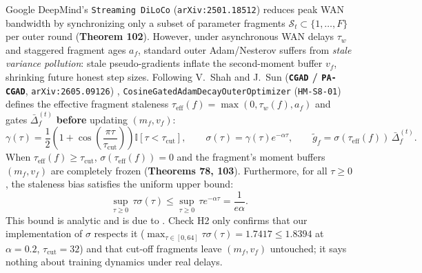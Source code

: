 \documentclass[11pt,a4paper]{article}
\begin{document}
Google DeepMind's \texttt{Streaming DiLoCo} (\texttt{arXiv:2501.18512}) \cite{douillard2025streamingdiloco} reduces peak WAN bandwidth by synchronizing only a subset of parameter fragments $\mathcal{S}_t \subset \{1, \dots, F\}$ per outer round (\textbf{Theorem 102}). However, under asynchronous WAN delays $\tau_w$ and staggered fragment ages $a_f$, standard outer Adam/Nesterov suffers from \textit{stale variance pollution}: stale pseudo-gradients inflate the second-moment buffer $v_f$, shrinking future honest step sizes. Following V.~Shah and J.~Sun (\textbf{\texttt{CGAD} / \texttt{PA-CGAD}}, \texttt{arXiv:2605.09126}) \cite{shah2026cgad}, \texttt{CosineGatedAdamDecayOuterOptimizer} (\texttt{HM-S8-01}) defines the effective fragment staleness $\tau_{\text{eff}}(f) = \max(0, \tau_w(f), a_f)$ and gates $\bar{\Delta}_f^{(t)}$ \textbf{before} updating $(m_f, v_f)$:
\begin{equation}
    \gamma(\tau) = \frac{1}{2}\left(1 + \cos\!\left(\frac{\pi \tau}{\tau_{\text{cut}}}\right)\right)\mathbb{I}[\tau < \tau_{\text{cut}}], \qquad \sigma(\tau) = \gamma(\tau) e^{-\alpha \tau}, \qquad \tilde{g}_f = \sigma(\tau_{\text{eff}}(f)) \, \bar{\Delta}_f^{(t)}.
\end{equation}
When $\tau_{\text{eff}}(f) \ge \tau_{\text{cut}}$, $\sigma(\tau_{\text{eff}}(f)) = 0$ and the fragment's moment buffers $(m_f, v_f)$ are completely frozen (\textbf{Theorems 78, 103}). Furthermore, for all $\tau \ge 0$, the staleness bias satisfies the uniform upper bound:
\begin{equation}
    \sup_{\tau \ge 0} \, \tau \sigma(\tau) \le \sup_{\tau \ge 0} \, \tau e^{-\alpha \tau} = \frac{1}{e \alpha}.
\end{equation}
This bound is analytic and is due to \cite{shah2026cgad}. Check H2 only confirms that our implementation of $\sigma$ respects it ($\max_{\tau \in [0, 64]} \tau \sigma(\tau) = 1.7417 \le 1.8394$ at $\alpha = 0.2$, $\tau_{\text{cut}} = 32$) and that cut-off fragments leave $(m_f, v_f)$ untouched; it says nothing about training dynamics under real delays.
\end{document}
